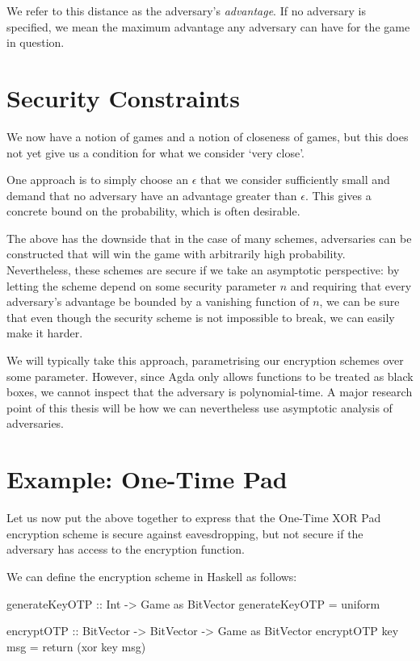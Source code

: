 We refer to this distance as the adversary's \emph{advantage}.  If no adversary is specified, we mean the maximum
advantage any adversary can have for the game in question.

\section{Security Constraints}

We now have a notion of games and a notion of closeness of games, but this does not yet give us a condition for what we
consider `very close'.

One approach is to simply choose an $\epsilon$ that we consider sufficiently small and demand that no adversary have an
advantage greater than $\epsilon$.  This gives a concrete bound on the probability, which is often desirable.

The above has the downside that in the case of many schemes, adversaries can be constructed that will win the game with
arbitrarily high probability.  Nevertheless, these schemes are secure if we take an asymptotic perspective: by letting
the scheme depend on some security parameter $n$ and requiring that every adversary's advantage be bounded by a
vanishing function of $n$, we can be sure that even though the security scheme is not impossible to break, we can easily
make it harder.

We will typically take this approach, parametrising our encryption schemes over some parameter.  However, since Agda
only allows functions to be treated as black boxes, we cannot inspect that the adversary is polynomial-time.  A major
research point of this thesis will be how we can nevertheless use asymptotic analysis of adversaries.

\section{Example: One-Time Pad}

Let us now put the above together to express that the One-Time XOR Pad encryption scheme is secure against
eavesdropping, but not secure if the adversary has access to the encryption function.

We can define the encryption scheme in Haskell as follows:
\begin{code}
    generateKeyOTP :: Int -> Game as BitVector
    generateKeyOTP = uniform

    encryptOTP :: BitVector -> BitVector -> Game as BitVector
    encryptOTP key msg = return (xor key msg)
\end{code}

